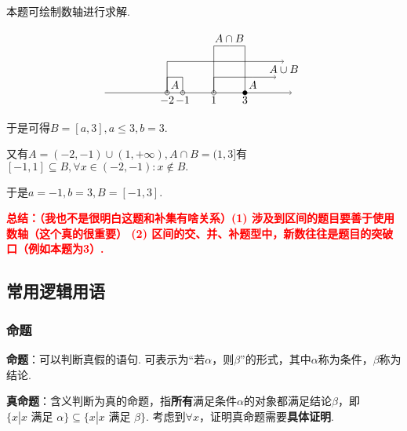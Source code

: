 \documentclass[8pt]{article}
\begin{document}
				本题可绘制数轴进行求解.

				$$
				\begin{tikzpicture} [scale=0.5]
					\draw [black] [->] (-6, 0)--(6, 0);

					\draw [black] (-2, 0) circle (4pt) node[anchor=north] {$-2$};
					\draw [black] (-1, 0) circle (4pt) node[anchor=north] {$-1$};
					\draw [black] (1, 0) circle (4pt) node[anchor=north] {$1$};
					\draw [black] (-2, 0)--(-2, 1)--(-1.5, 1) node[anchor=north] {$A$};
					\draw [black] (-1.5, 1)--(-1, 1)--(-1, 0);
					\draw [black] (1, 0)--(1, 1)--(3.5, 1) node[anchor=north] {$A$};
					\draw [black] [->] (3.5, 1)--(5, 1);
					
					\draw [black] (-2, 0)--(-2, 2);
					\draw [black] [->] (-2, 2)--(5.5, 2) node[anchor=north] {$A\cup B$};

					\filldraw [black] (3, 0) circle (4pt) node[anchor=north] {$3$};

					\draw [black] (1, 0)--(1, 3)--(2, 3) node[anchor=south] {$A\cap B$};

					\draw [black] (2, 3)--(3, 3)--(3, 0);
				\end{tikzpicture}
				$$

				于是可得$B=[a, 3], a\leq 3, b=3.$

				又有$A=(-2, -1)\cup(1, +\infty), A\cap B=(1, 3]$有$[-1, 1]\subseteq B, \forall x\in (-2, -1): x\notin B.$

				于是$a=-1, b=3, B=[-1, 3].$

				\textcolor{red}{\textbf{总结：（我也不是很明白这题和补集有啥关系）(1) 涉及到区间的题目要善于使用数轴（这个真的很重要） (2) 区间的交、并、补题型中，新数往往是题目的突破口（例如本题为3）.}}

		\pagebreak

		\subsection{常用逻辑用语}
			\subsubsection{命题}
				\textbf{命题}：可以判断真假的语句. 可表示为“若$\alpha$，则$\beta$”的形式，其中$\alpha$称为条件，$\beta$称为结论.

				\textbf{真命题}：含义判断为真的命题，指\textbf{所有}满足条件$\alpha$的对象都满足结论$\beta$，即$\{x|x\text{ 满足 }\alpha\}\subseteq\{x|x\text{ 满足 }\beta\}$. 考虑到$\forall x$，证明真命题需要\textbf{具体证明}.
\end{document}
